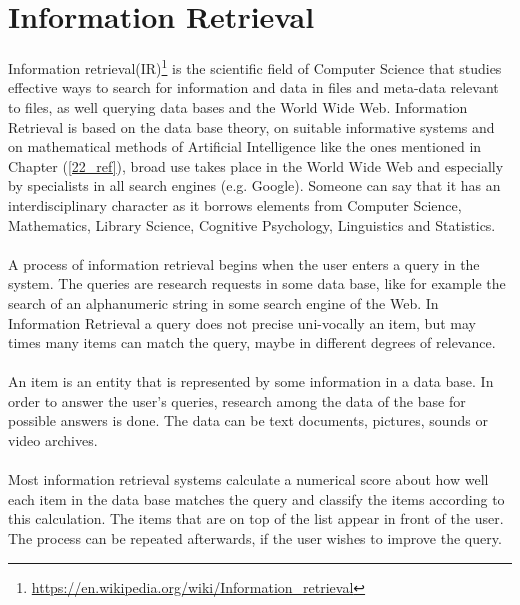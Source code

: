 \section{Information Retrieval}\label{23_ref}
Information retrieval(IR)\footnote{\url{https://en.wikipedia.org/wiki/Information_retrieval}} is the scientific field of Computer Science that studies effective ways to search for information and data in files and meta-data relevant to files, as well querying data bases and the World Wide Web. Information Retrieval is based on the data base theory, on suitable informative systems and on mathematical methods of Artificial Intelligence like the ones mentioned in Chapter (\ref{22_ref}), broad use takes place in the World Wide Web and especially by specialists in all search engines (e.g. Google). Someone can say that it has an interdisciplinary character as it borrows elements from Computer Science, Mathematics, Library Science, Cognitive Psychology, Linguistics and Statistics.\\
\\
A process of information retrieval begins when the user enters a query in the system. The queries are research requests in some data base, like for example the search of an alphanumeric string in some search engine of the Web. In Information Retrieval a query does not precise uni-vocally an item, but may times many items can match the query, maybe in different degrees of relevance.\\
\\
An item is an entity that is represented by some information in a data base. In order to answer the user's queries, research among the data of the base for possible answers is done. The data can be text documents, pictures, sounds or video archives.\\
\\
Most information retrieval systems calculate a numerical score about how well each item in the data base matches the query and classify the items according to this calculation. The items that are on top of the list appear in front of the user. The process can be repeated afterwards, if the user wishes to improve the query.

